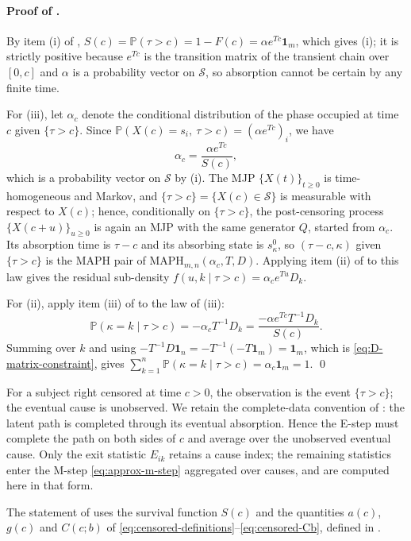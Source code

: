 \documentclass{article}
\newcommand{\Prob}{\mathbb{P}}
\newcommand{\cs}{\mathcal{S}}
\newenvironment{aarevision}{}{}
\newcommand{\subchg}[1]{#1}
\begin{document}
\begin{aarevision}
\paragraph{Proof of .}
By item (i) of , $S(c)=\Prob(\tau>c)=1-F(c)=\alpha e^{Tc}\mathbf{1}_m$, which gives (i); it is strictly positive because $e^{Tc}$ is the transition matrix of the transient chain over $[0,c]$ and $\alpha$ is a probability vector on $\cs$, so absorption cannot be certain by any finite time.

For (iii), let $\alpha_c$ denote the conditional distribution of the phase occupied at time $c$ given $\{\tau>c\}$. Since $\Prob(X(c)=s_i,\ \tau>c)=(\alpha e^{Tc})_i$, we have
\[
\alpha_c=\frac{\alpha e^{Tc}}{S(c)},
\]
which is a probability vector on $\cs$ by (i). The MJP $\{X(t)\}_{t\ge0}$ is time-homogeneous and Markov, and $\{\tau>c\}=\{X(c)\in\cs\}$ is measurable with respect to $X(c)$; hence, conditionally on $\{\tau>c\}$, the post-censoring process $\{X(c+u)\}_{u\ge0}$ is again an MJP with the same generator $Q$, started from $\alpha_c$. Its absorption time is $\tau-c$ and its absorbing state is $s^0_\kappa$, so $(\tau-c,\kappa)$ given $\{\tau>c\}$ is the MAPH pair of $\text{MAPH}_{m,n}(\alpha_c,T,D)$. Applying item (ii) of  to this law gives the residual sub-density $f(u,k\mid\tau>c)=\alpha_c e^{Tu}D_k$.

For (ii), apply item (iii) of  to the law of (iii):
\[
\Prob(\kappa=k\mid\tau>c)=-\alpha_cT^{-1}D_k=\frac{-\alpha e^{Tc}T^{-1}D_k}{S(c)}.
\]
Summing over $k$ and using $-T^{-1}D\mathbf{1}_n=-T^{-1}(-T\mathbf{1}_m)=\mathbf{1}_m$, which is \eqref{eq:D-matrix-constraint}, gives $\sum_{k=1}^n\Prob(\kappa=k\mid\tau>c)=\alpha_c\mathbf{1}_m=1$. \qed
\end{aarevision}

For a subject right censored at time $c>0$, the observation is the event $\{\tau>c\}$; the eventual cause is unobserved. We retain the complete-data convention of : the latent path is completed through its eventual absorption. \subchg{Hence the E-step must complete the path on both sides of $c$ and average over the unobserved eventual cause. Only the exit statistic $E_{ik}$ retains a cause index; the remaining statistics enter the M-step \eqref{eq:approx-m-step} aggregated over causes, and are computed here in that form.}

The statement of  uses the survival function $S(c)$ and the
quantities $a(c)$, $g(c)$ and $C(c;b)$ of \eqref{eq:censored-definitions}--\eqref{eq:censored-Cb}, defined in .
\end{document}
